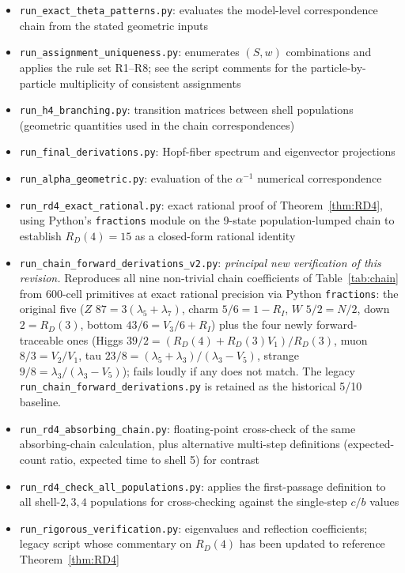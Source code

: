\documentclass[12pt]{article}
\begin{document}
\begin{itemize}
    \item \texttt{run\_exact\_theta\_patterns.py}: evaluates the model-level correspondence chain from the stated geometric inputs
    \item \texttt{run\_assignment\_uniqueness.py}: enumerates $(S,w)$ combinations and applies the rule set R1--R8; see the script comments for the particle-by-particle multiplicity of consistent assignments
    \item \texttt{run\_h4\_branching.py}: transition matrices between shell populations (geometric quantities used in the chain correspondences)
    \item \texttt{run\_final\_derivations.py}: Hopf-fiber spectrum and eigenvector projections
    \item \texttt{run\_alpha\_geometric.py}: evaluation of the $\alpha^{-1}$ numerical correspondence
    \item \texttt{run\_rd4\_exact\_rational.py}: exact rational proof of Theorem~\ref{thm:RD4}, using Python's \texttt{fractions} module on the 9-state population-lumped chain to establish $R_D(4) = 15$ as a closed-form rational identity
    \item \texttt{run\_chain\_forward\_derivations\_v2.py}: \emph{principal new verification of this revision.} Reproduces all nine non-trivial chain coefficients of Table~\ref{tab:chain} from 600-cell primitives at exact rational precision via Python \texttt{fractions}: the original five ($Z$ $87 = 3(\lambda_5+\lambda_7)$, charm $5/6 = 1 - R_I$, $W$ $5/2 = N/2$, down $2 = R_D(3)$, bottom $43/6 = V_3/6 + R_I$) plus the four newly forward-traceable ones (Higgs $39/2 = (R_D(4) + R_D(3) V_1)/R_D(3)$, muon $8/3 = V_2/V_1$, tau $23/8 = (\lambda_5 + \lambda_3)/(\lambda_3 - V_5)$, strange $9/8 = \lambda_3/(\lambda_3 - V_5)$); fails loudly if any does not match. The legacy \texttt{run\_chain\_forward\_derivations.py} is retained as the historical 5/10 baseline.
    \item \texttt{run\_rd4\_absorbing\_chain.py}: floating-point cross-check of the same absorbing-chain calculation, plus alternative multi-step definitions (expected-count ratio, expected time to shell 5) for contrast
    \item \texttt{run\_rd4\_check\_all\_populations.py}: applies the first-passage definition to all shell-$2,3,4$ populations for cross-checking against the single-step $c/b$ values
    \item \texttt{run\_rigorous\_verification.py}: eigenvalues and reflection coefficients; legacy script whose commentary on $R_D(4)$ has been updated to reference Theorem~\ref{thm:RD4}

\end{itemize}
\end{document}
